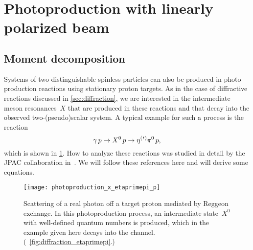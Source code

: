 \section{Photoproduction with linearly polarized beam}%
\label{sec:photoprod}

\subsection{Moment decomposition}%
\label{sec:photoprod:moment}

Systems of two distinguishable spinless particles can also be produced
in photo-production reactions using stationary proton targets.  As in
the case of diffractive reactions discussed in \cref{sec:diffraction},
we are interested in the intermediate meson resonances~$X$ that are
produced in these reactions and that decay into the observed
two-(pseudo)scalar system.  A typical example for such a process is
the reaction
\begin{equation}
  \gamma\, p \to X^0\, p \to \etaOrPr\pi^0\, p,
\end{equation}
which is shown in \cref{fig:photoprod_etaprimepi}.  How to analyze
these reactions was studied in detail by the JPAC collaboration
in~.  We will follow these
references here and will derive some equations.

\begin{figure}[bp]
  \centering%
  \texttt{[image: photoproduction\_x\_etaprimepi\_p]}%
  \caption{Scattering of a real photon off a target proton mediated by
  Reggeon exchange.  In this photoproduction process, an intermediate
  state~$X^0$ with well-defined quantum numbers is produced, which in
  the example given here decays into the \etaOrPrPim channel.
  (\Confer~\cref{fig:diffraction_etaprimepi}.)}%
  \label{fig:photoprod_etaprimepi}%
\end{figure}

